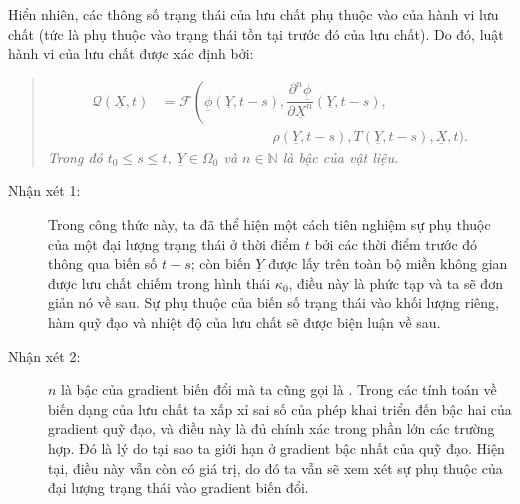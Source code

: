 \documentclass[../../../main.tex]{subfiles}
\begin{document}
    Hiển nhiên, các thông số trạng thái của lưu chất phụ thuộc vào  của hành vi lưu chất (tức là phụ thuộc vào trạng thái tồn tại trước đó của lưu chất). Do đó, luật hành vi của lưu chất được xác định bởi:
    	\begin{quotation}
    			\begin{equation}\label{eq:fonction_comportement}
    				\begin{aligned}
    					\mathcal{Q}\left(\underline{X},t\right)&=\mathcal{F}\left(\underline{\phi}\left(\underline{Y},t-s\right),\dfrac{\partial^n\underline{\phi}}{\partial\underline{X}^n}\left(\underline{Y},t-s\right),\right.\\
					&\qquad\qquad\qquad\qquad\rho\left(\underline{Y},t-s\right),T\left(\underline{Y},t-s\right),\underline{X},t\bigg).
    				\end{aligned}
    			\end{equation}
    		\emph{Trong đó $t_0\leq s\leq t$, $\underline{Y}\in\Omega_0$ và $n\in\mathbb{N}$ là bậc của vật liệu.}
    	\end{quotation}
    \begin{description}
    	\item[Nhận xét 1:] Trong công thức này, ta đã thể hiện một cách tiên nghiệm sự phụ thuộc của một đại lượng trạng thái ở thời điểm $t$ bởi các thời điểm trước đó thông qua biến số $t-s$; còn biến $\underline{Y}$ được lấy trên toàn bộ miền không gian được lưu chất chiếm trong hình thái $\kappa_0$, điều này là phức tạp và ta sẽ đơn giản nó về sau. Sự phụ thuộc của biến số trạng thái vào khối lượng riêng, hàm quỹ đạo và nhiệt độ của lưu chất sẽ được biện luận về sau.
    	\item[Nhận xét 2:] $n$ là bậc của gradient biến đổi mà ta cũng gọi là . Trong các tính toán về biến dạng của lưu chất ta xấp xỉ sai số của phép khai triển đến bậc hai của gradient quỹ đạo, và điều này là đủ chính xác trong phần lớn các trường hợp. Đó là lý do tại sao ta giới hạn ở gradient bậc nhất của quỹ đạo. Hiện tại, điều này vẫn còn có giá trị, do đó ta vẫn sẽ xem xét sự phụ thuộc của đại lượng trạng thái vào gradient biến đổi.
    \end{description}
    
\end{document}
